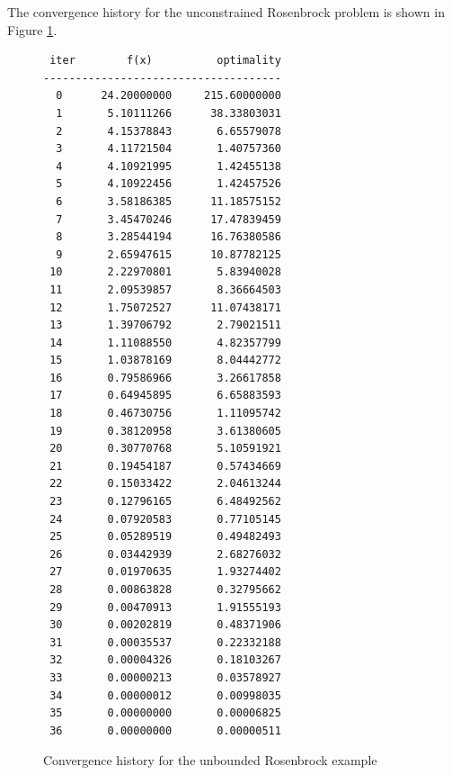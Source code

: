 \documentclass[11pt]{article}
\begin{document}
The convergence history for the unconstrained Rosenbrock
problem is shown in Figure \ref{fig:ros_unc_conv}.
%
\begin{figure}[hbt!]
\scriptsize
\centering
\begin{BVerbatim}
 iter        f(x)          optimality
-------------------------------------
  0      24.20000000     215.60000000
  1       5.10111266      38.33803031
  2       4.15378843       6.65579078
  3       4.11721504       1.40757360
  4       4.10921995       1.42455138
  5       4.10922456       1.42457526
  6       3.58186385      11.18575152
  7       3.45470246      17.47839459
  8       3.28544194      16.76380586
  9       2.65947615      10.87782125
 10       2.22970801       5.83940028
 11       2.09539857       8.36664503
 12       1.75072527      11.07438171
 13       1.39706792       2.79021511
 14       1.11088550       4.82357799
 15       1.03878169       8.04442772
 16       0.79586966       3.26617858
 17       0.64945895       6.65883593
 18       0.46730756       1.11095742
 19       0.38120958       3.61380605
 20       0.30770768       5.10591921
 21       0.19454187       0.57434669
 22       0.15033422       2.04613244
 23       0.12796165       6.48492562
 24       0.07920583       0.77105145
 25       0.05289519       0.49482493
 26       0.03442939       2.68276032
 27       0.01970635       1.93274402
 28       0.00863828       0.32795662
 29       0.00470913       1.91555193
 30       0.00202819       0.48371906
 31       0.00035537       0.22332188
 32       0.00004326       0.18103267
 33       0.00000213       0.03578927
 34       0.00000012       0.00998035
 35       0.00000000       0.00006825
 36       0.00000000       0.00000511
\end{BVerbatim}
\caption{Convergence history for the unbounded Rosenbrock example}
\label{fig:ros_unc_conv}
\end{figure}
\end{document}
